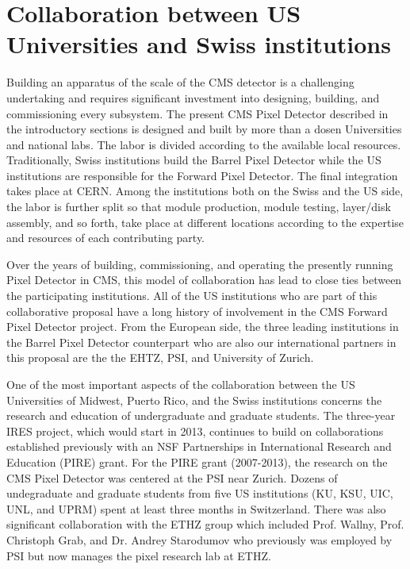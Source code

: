 
\section{Collaboration between US Universities and
    Swiss institutions}

  Building an apparatus of the scale of the CMS detector is a
  challenging undertaking and requires significant investment into
  designing, building, and commissioning every subsystem. The present
  CMS Pixel Detector described in the introductory sections is
  designed and built by more than a dosen Universities and national
  labs. The labor is divided according to the available local
  resources.  Traditionally, Swiss institutions build the Barrel Pixel
  Detector while the US institutions are responsible for the Forward
  Pixel Detector. The final integration takes place at CERN. Among the
  institutions both on the Swiss and the US side, the labor is further
  split so that module production, module testing, layer/disk
  assembly, and so forth, take place at different locations according
  to the expertise and resources of each contributing party. 

  Over the years of building, commissioning, and operating the
  presently running Pixel Detector in CMS, this model of collaboration
  has lead to close ties between the participating institutions. All
  of the US institutions who are part of this collaborative proposal
  have a long history of involvement in the CMS Forward Pixel Detector
  project. From the European side, the three leading institutions in
  the Barrel Pixel Detector counterpart who are also our international
  partners in this proposal are the the EHTZ, PSI, and University of
  Zurich.

  One of the most important aspects of the collaboration between the
  US Universities of Midwest, Puerto Rico, and the Swiss institutions
  concerns the research and education of undergraduate and graduate
  students. The three-year IRES project, which would start in 2013,
  continues to build on collaborations established previously with an
  NSF Partnerships in International Research and Education (PIRE)
  grant. For the PIRE grant (2007-2013), the research on the CMS Pixel
  Detector was centered at the PSI near Zurich. Dozens of undegraduate
  and graduate students from five US institutions (KU, KSU, UIC, UNL,
  and UPRM) spent at least three months in Switzerland.  There was
  also significant collaboration with the ETHZ group which included
  Prof. Wallny, Prof. Christoph Grab, and Dr. Andrey Starodumov who
  previously was employed by PSI but now manages the pixel research
  lab at ETHZ.  

